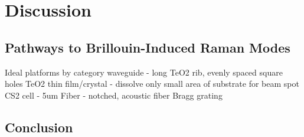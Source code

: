 
\section{Discussion}
\label{sec:Raman:Discussion}

\subsection{Pathways to Brillouin-Induced Raman Modes}
\label{subsec:Raman:Pathways}
Ideal platforms by category
  waveguide - long TeO2 rib, evenly spaced square holes
  TeO2 thin film/crystal - dissolve only small area of substrate for beam spot
  CS2 cell - 5um
  Fiber - notched, acoustic fiber Bragg grating

\subsection{Conclusion}
\label{subsec:Raman:Conclusion}


\clearpage
\thispagestyle{empty}
\null
\newpage
